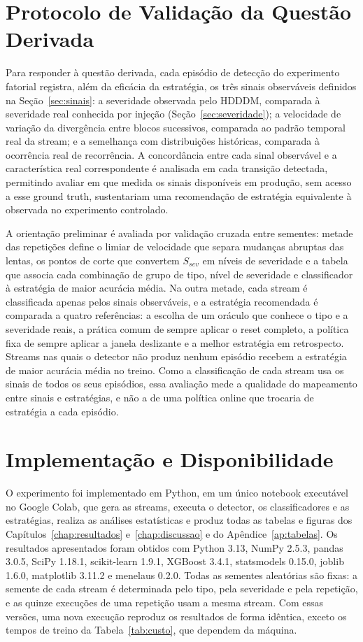\section{Protocolo de Validação da Questão Derivada}
Para responder à questão derivada, cada episódio de detecção do experimento
fatorial registra, além da eficácia da estratégia, os três sinais observáveis
definidos na Seção~\ref{sec:sinais}: a severidade observada pelo HDDDM,
comparada à severidade real conhecida por injeção (Seção~\ref{sec:severidade});
a velocidade de variação da divergência entre blocos sucessivos, comparada
ao padrão temporal real da stream; e a semelhança com distribuições
históricas, comparada à ocorrência real de recorrência. A concordância entre
cada sinal observável e a característica real correspondente é analisada
em cada transição detectada, permitindo avaliar em que medida os sinais disponíveis
em produção, sem acesso a esse ground truth, sustentariam uma recomendação
de estratégia equivalente à observada no experimento controlado.

A orientação preliminar é avaliada por validação cruzada entre sementes:
metade das repetições define o limiar de velocidade que separa mudanças
abruptas das lentas, os pontos de corte que convertem $S_{sev}$ em níveis
de severidade e a tabela que associa cada combinação de grupo de tipo,
nível de severidade e classificador à estratégia de maior acurácia média. Na
outra metade, cada stream é classificada apenas pelos sinais observáveis, e
a estratégia recomendada é comparada a quatro referências: a escolha de um
oráculo que conhece o tipo e a severidade reais, a prática comum de sempre
aplicar o reset completo, a política fixa de sempre aplicar a janela
deslizante e a melhor estratégia em retrospecto. Streams nas quais o
detector não produz nenhum episódio recebem a estratégia de maior acurácia
média no treino. Como a classificação de cada stream usa os sinais de todos
os seus episódios, essa avaliação mede a qualidade do mapeamento entre
sinais e estratégias, e não a de uma política online que trocaria de
estratégia a cada episódio.

\section{Implementação e Disponibilidade}
\label{sec:disponibilidade}
O experimento foi implementado em Python, em um único notebook executável no
Google Colab, que gera as streams, executa o detector, os classificadores e
as estratégias, realiza as análises estatísticas e produz todas as tabelas e
figuras dos Capítulos~\ref{chap:resultados} e~\ref{chap:discussao} e do
Apêndice~\ref{ap:tabelas}. Os resultados apresentados foram obtidos com
Python 3.13, NumPy 2.5.3, pandas 3.0.5, SciPy 1.18.1, scikit-learn 1.9.1,
XGBoost 3.4.1, statsmodels 0.15.0, joblib 1.6.0, matplotlib 3.11.2 e
menelaus 0.2.0. Todas as sementes aleatórias são fixas: a semente de cada
stream é determinada pelo tipo, pela severidade e pela repetição, e as
quinze execuções de uma repetição usam a mesma stream. Com essas versões,
uma nova execução reproduz os resultados de forma idêntica, exceto os tempos
de treino da Tabela~\ref{tab:custo}, que dependem da máquina.

